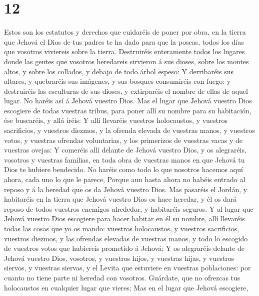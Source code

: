 \hypertarget{section-11}{%
\section{12}\label{section-11}}

 Estos son los estatutos y derechos que cuidaréis de poner
por obra, en la tierra que Jehová el Dios de tus padres te ha dado para
que la poseas, todos los días que vosotros viviereis sobre la tierra.
 Destruiréis enteramente todos los lugares donde las
gentes que vosotros heredareis sirvieron á sus dioses, sobre los montes
altos, y sobre los collados, y debajo de todo árbol espeso:
 Y derribaréis sus altares, y quebraréis sus imágenes, y
sus bosques consumiréis con fuego: y destruiréis las esculturas de sus
dioses, y extirparéis el nombre de ellas de aquel lugar. 
No haréis así á Jehová vuestro Dios.  Mas el lugar que
Jehová vuestro Dios escogiere de todas vuestras tribus, para poner allí
su nombre para su habitación, ése buscaréis, y allá iréis:
 Y allí llevaréis vuestros holocaustos, y vuestros
sacrificios, y vuestros diezmos, y la ofrenda elevada de vuestras manos,
y vuestros votos, y vuestras ofrendas voluntarias, y los primerizos de
vuestras vacas y de vuestras ovejas:  Y comeréis allí
delante de Jehová vuestro Dios, y os alegraréis, vosotros y vuestras
familias, en toda obra de vuestras manos en que Jehová tu Dios te
hubiere bendecido.  No haréis como todo lo que nosotros
hacemos aquí ahora, cada uno lo que le parece,  Porque aun
hasta ahora no habéis entrado al reposo y á la heredad que os da Jehová
vuestro Dios.  Mas pasaréis el Jordán, y habitaréis en la
tierra que Jehová vuestro Dios os hace heredar, y él os dará reposo de
todos vuestros enemigos alrededor, y habitaréis seguros. 
Y al lugar que Jehová vuestro Dios escogiere para hacer habitar en él su
nombre, allí llevaréis todas las cosas que yo os mando: vuestros
holocaustos, y vuestros sacrificios, vuestros diezmos, y las ofrendas
elevadas de vuestras manos, y todo lo escogido de vuestros votos que
hubiereis prometido á Jehová;  Y os alegraréis delante de
Jehová vuestro Dios, vosotros, y vuestros hijos, y vuestras hijas, y
vuestros siervos, y vuestras siervas, y el Levita que estuviere en
vuestras poblaciones: por cuanto no tiene parte ni heredad con vosotros.
 Guárdate, que no ofrezcas tus holocaustos en cualquier
lugar que vieres;  Mas en el lugar que Jehová escogiere,
